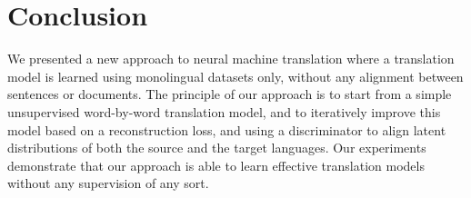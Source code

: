 \section{Conclusion} \label{sec:conclusion}


We presented a new approach to neural machine translation where a translation model is learned using monolingual datasets only, without any alignment between sentences or documents. The principle of our approach is to start from a simple unsupervised word-by-word translation model, and to iteratively improve this model based on a reconstruction loss, and using a discriminator to align latent distributions of both the source and the target languages. Our experiments demonstrate that our approach is able to learn effective translation models without any supervision of any sort.

